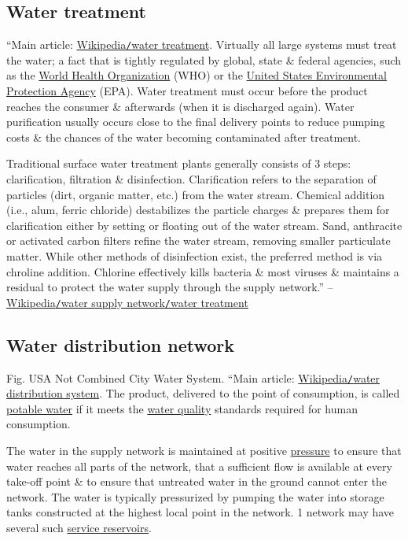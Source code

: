 \documentclass[oneside]{book}
\numberwithin{equation}{section}
\begin{document}
\subsection{Water treatment}
``Main article: \href{https://en.wikipedia.org/wiki/Water_treatment}{Wikipedia\texttt{/}water treatment}. Virtually all large systems must treat the water; a fact that is tightly regulated by global, state \& federal agencies, such as the \href{https://en.wikipedia.org/wiki/World_Health_Organization}{World Health Organization} (WHO) or the \href{https://en.wikipedia.org/wiki/United_States_Environmental_Protection_Agency}{United States Environmental Protection Agency} (EPA). Water treatment must occur before the product reaches the consumer \& afterwards (when it is discharged again). Water purification usually occurs close to the final delivery points to reduce pumping costs \& the chances of the water becoming contaminated after treatment.

Traditional surface water treatment plants generally consists of 3 steps: clarification, filtration \& disinfection. Clarification refers to the separation of particles (dirt, organic matter, etc.) from the water stream. Chemical addition (i.e., alum, ferric chloride) destabilizes the particle charges \& prepares them for clarification either by setting or floating out of the water stream. Sand, anthracite or activated carbon filters refine the water stream, removing smaller particulate matter. While other methods of disinfection exist, the preferred method is via chroline addition. Chlorine effectively kills bacteria \& most viruses \& maintains a residual to protect the water supply through the supply network.'' -- \href{https://en.wikipedia.org/wiki/Water_supply_network#Water_treatment}{Wikipedia\texttt{/}water supply network\texttt{/}water treatment}

\subsection{Water distribution network}
\textsf{Fig. USA Not Combined City Water System.} ``Main article: \href{https://en.wikipedia.org/wiki/Water_distribution_system}{Wikipedia\texttt{/}water distribution system}. The product, delivered to the point of consumption, is called \href{https://en.wikipedia.org/wiki/Potable_water}{potable water} if it meets the \href{https://en.wikipedia.org/wiki/Water_quality}{water quality} standards required for human consumption.

The water in the supply network is maintained at positive \href{https://en.wikipedia.org/wiki/Pressure}{pressure} to ensure that water reaches all parts of the network, that a sufficient flow is available at every take-off point \& to ensure that untreated water in the ground cannot enter the network. The water is typically pressurized by pumping the water into storage tanks constructed at the highest local point in the network. 1 network may have several such \href{https://en.wikipedia.org/wiki/Service_reservoir}{service reservoirs}.
\end{document}
